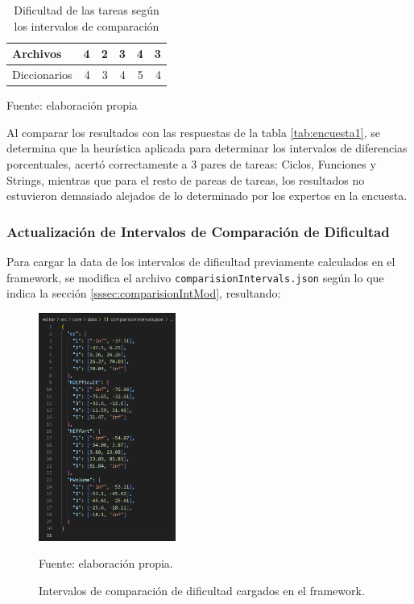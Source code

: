 \documentclass[letterpaper,12pt]{article}
\begin{document}
\begin{table}[H]
\begin{tabular}{|l|r|r|r|r|r|}
    Archivos        & 4                                                                                                & 2                                           & 3                                      & 4                                     & 3                                      \\ \hline
    Diccionarios    & 4                                                                                                & 3                                           & 4                                      & 5                                     & 4                                      \\ \hline
  \end{tabular}
  \caption{Dificultad de las tareas según los intervalos de comparación} Fuente: elaboración propia
  \label{tab:difDifferences}
\end{table}
Al comparar los resultados con las respuestas de la tabla \ref{tab:encuesta1}, se determina que la heurística aplicada para determinar los intervalos de diferencias porcentuales, acertó correctamente a 3 pares de tareas: Ciclos, Funciones y Strings, mientras que para el resto de pareas de tareas, los resultados no estuvieron demasiado alejados de lo determinado por los expertos en la encuesta.
\subsubsection{Actualización de Intervalos de Comparación de Dificultad}
Para cargar la data de los intervalos de dificultad previamente calculados en el framework, se modifica el archivo \texttt{comparisionIntervals.json} según lo que indica la sección \ref{sssec:comparisionIntMod}, resultando:
\begin{figure}[H]
  \centering
  \includegraphics[width=0.4\textwidth]{figures/intervals5.png}
  \caption{Intervalos de comparación de dificultad cargados en el framework.} Fuente: elaboración propia.
  \label{img:intervals5}
\end{figure}
\end{document}
